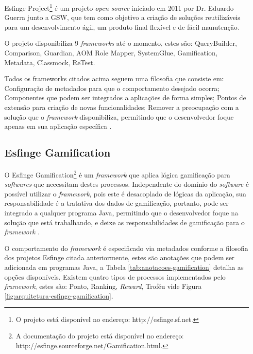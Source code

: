 \par Esfinge Project\footnote{O projeto está disponível no endereço: http://esfinge.sf.net.} é um projeto \textit{open-source} iniciado em 2011 por Dr. Eduardo Guerra junto a GSW, que tem como objetivo a criação de soluções reutilizáveis para um desenvolvimento ágil, um produto final flexível e de fácil manutenção.
\par O projeto disponibiliza 9 \textit{frameworks} até o momento, estes são: QueryBuilder, Comparison, Guardian, AOM Role Mapper, SystemGlue, Gamification, Metadata, Classmock, ReTest.
\par Todos os frameworks citados acima seguem uma filosofia que consiste em: Configuração de metadados para que o comportamento desejado ocorra; Componentes que podem ser integrados a aplicações de forma simples; Pontos de extensão para criação de novas funcionalidades; Remover a preocupação com a solução que o \textit{framework} disponibiliza, permitindo que o desenvolvedor foque apenas em sua aplicação específica .

\subsection{Esfinge Gamification}

\par O Esfinge Gamification\footnote{A documentação do projeto está disponível no endereço: http://esfinge.sourceforge.net/Gamification.html.} é um \textit{framework} que aplica lógica gamificação para \textit{softwares} que necessitam destes processos. Independente do domínio do \textit{software} é possível utilizar o \textit{framework}, pois este é desacoplado de lógicas da aplicação, sua responsabilidade é a tratativa dos dados de gamificação, portanto, pode ser integrado a qualquer programa Java, permitindo que o desenvolvedor foque na solução que está trabalhando, e deixe as responsabilidades de gamificação para o \textit{framework}  .


\par O comportamento do \textit{framework} é especificado via metadados conforme a filosofia dos projetos Esfinge citada anteriormente, estes são anotações que podem ser adicionada em programas Java, a Tabela \ref{tab:anotacoes-gamification} detalha as opções disponíveis. Existem quatro tipos de processos implementados pelo \textit{framework}, estes são: Ponto, Ranking, \textit{Reward}, Troféu vide Figura \ref{fig:arquitetura-esfinge-gamification}.

